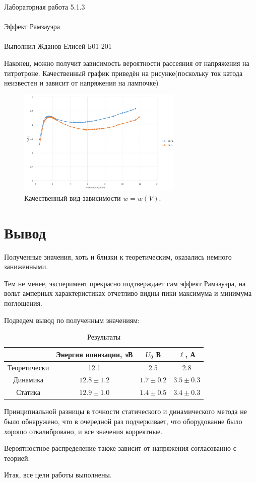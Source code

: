 \documentclass{astroedu-lab}
\begin{document}
\begin{problem}{\huge Лабораторная работа 5.1.3\\\\Эффект Рамзауэра\\\\Выполнил Жданов Елисей Б01-201}
\newpage

Наконец, можно получит зависимость вероятности рассеяния от напряжения на титротроне. Качественный график приведён на рисунке(поскольку ток катода неизвестен и зависит от напряжения на лампочке) 

\begin{figure}
\includegraphics[width = 0.7\textwidth]{wu.png}
\centering
\caption{Качественный вид зависимости $w = w(V)$.}
\end{figure}


\section{Вывод}

Полученные значения, хоть и близки к теоретическим, оказались немного заниженными. 

Тем не менее, эксперимент прекрасно подтверждает сам эффект Рамзауэра, на вольт амперных характеристиках отчетливо видны пики максимума и минимума поглощения. 

Подведем вывод по полученным значениям:
\\
\begin{table}[h]
\begin{tabular}{|c|c|c|c|}
\hline
  & Энергия ионизации, эВ & $U_0$ В & $\ell$, А \\ \hline
Теоретически & 12.1 & 2.5 & 2.8  \\
Динамика & $12.8 \pm 1.2$       & $1.7 \pm 0.2$                   & $3.5 \pm 0.3$                               \\
Статика & $12.9 \pm 1.0$      & $1.4 \pm 0.5$                   & $3.4 \pm 0.3$                                  \\ \hline
\end{tabular}
\centering
\caption{Результаты}
\end{table}

Принципиальной разницы в точности статического и динамического метода не было обнаружено, что в очередной раз подчеркивает, что оборудование было хорошо откалибровано, и все значения корректные.

Вероятностное распределение также зависит от напряжения согласованно с теорией.

Итак, все цели работы выполнены.


\end{problem}
\end{document}
